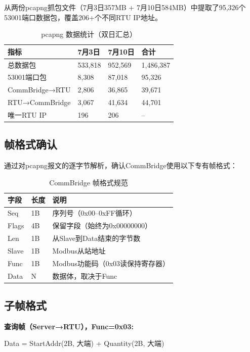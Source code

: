 \documentclass[12pt,a4paper]{ctexart}
\begin{document}
从两份pcapng抓包文件（7月3日357MB + 7月10日584MB）中提取了95,326个53001端口数据包，覆盖206+个不同RTU IP地址。

\begin{table}[H]\centering
\caption{pcapng 数据统计（双日汇总）}
\begin{tabular}{p{3.5cm}p{2.5cm}p{2.5cm}p{3cm}}
\toprule
\textbf{指标} & \textbf{7月3日} & \textbf{7月10日} & \textbf{合计} \\
\midrule
总数据包 & 533,818 & 952,569 & 1,486,387 \\
53001端口包 & 8,308 & 87,018 & 95,326 \\
CommBridge→RTU & 2,806 & 36,865 & 39,671 \\
RTU→CommBridge & 3,067 & 41,634 & 44,701 \\
唯一RTU IP & 196 & 206 & -- \\
\bottomrule
\end{tabular}
\end{table}

\subsection{帧格式确认}

通过对pcapng报文的逐字节解析，确认CommBridge使用以下专有帧格式：

\begin{table}[H]\centering
\caption{CommBridge 帧格式规范}
\begin{tabular}{p{2.5cm}p{1.5cm}p{7cm}}
\toprule
\textbf{字段} & \textbf{长度} & \textbf{说明} \\
\midrule
Seq & 1B & 序列号（0x00--0xFF循环） \\
Flags & 4B & 保留字段（始终为0x00000000） \\
Len & 1B & 从Slave到Data结束的字节数 \\
Slave & 1B & Modbus从站地址 \\
Func & 1B & Modbus功能码（0x03读保持寄存器） \\
Data & N & 数据体，取决于Func \\
\bottomrule
\end{tabular}
\end{table}

\subsection{子帧格式}

\textbf{查询帧（Server→RTU），Func=0x03:}

Data = StartAddr(2B, 大端) + Quantity(2B, 大端)
\end{document}
